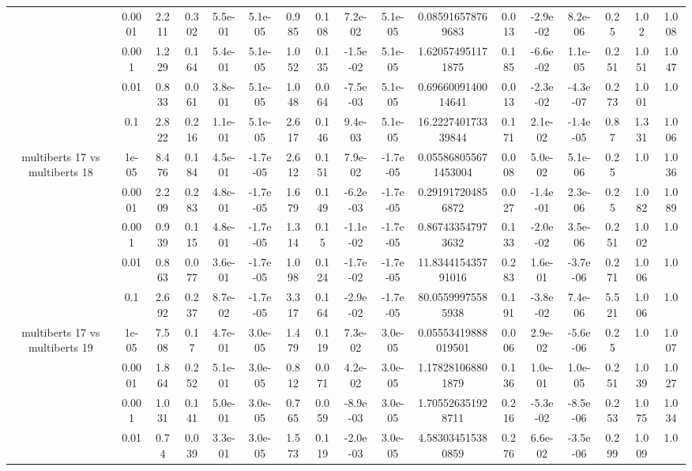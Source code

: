 \begin{tabular}{|c|c|c|c|c|c|c|c|c|c|c|c|c|c|c|c|c|}
 & 0.0001 & 2.211 & 0.302 & 5.5e-01 & 5.1e-05 & 0.985 & 0.108 & 7.2e-02 & 5.1e-05 & 0.085916578769683 & 0.013 & -2.9e-02 & 8.2e-06 & 0.25 & 1.02 & 1.008 \\
 & 0.001 & 1.229 & 0.164 & 5.4e-01 & 5.1e-05 & 1.052 & 0.135 & -1.5e-02 & 5.1e-05 & 1.620574951171875 & 0.185 & -6.6e-02 & 1.1e-05 & 0.251 & 1.051 & 1.047 \\
 & 0.01 & 0.833 & 0.061 & 3.8e-01 & 5.1e-05 & 1.048 & 0.064 & -7.5e-03 & 5.1e-05 & 0.6966009140014641 & 0.013 & -2.3e-02 & -4.3e-07 & 0.273 & 1.001 & 1.0 \\
 & 0.1 & 2.822 & 0.216 & 1.1e-01 & 5.1e-05 & 2.617 & 0.146 & 9.4e-03 & 5.1e-05 & 16.222740173339844 & 0.171 & 2.1e-02 & -1.4e-05 & 0.87 & 1.331 & 1.006 \\
\hline
\multirow{5}{*}{multiberts 17 vs multiberts 18} & 1e-05 & 8.476 & 0.184 & 4.5e-01 & -1.7e-05 & 2.612 & 0.151 & 7.9e-02 & -1.7e-05 & 0.055868055671453004 & 0.008 & 5.0e-02 & 5.1e-06 & 0.25 & 1.0 & 1.036 \\
 & 0.0001 & 2.209 & 0.283 & 4.8e-01 & -1.7e-05 & 1.679 & 0.149 & -6.2e-03 & -1.7e-05 & 0.291917204856872 & 0.027 & -1.4e-01 & 2.3e-06 & 0.25 & 1.082 & 1.089 \\
 & 0.001 & 0.939 & 0.115 & 4.8e-01 & -1.7e-05 & 1.314 & 0.15 & -1.1e-02 & -1.7e-05 & 0.867433547973632 & 0.133 & -2.0e-02 & 3.5e-06 & 0.251 & 1.002 & 1.0 \\
 & 0.01 & 0.863 & 0.077 & 3.6e-01 & -1.7e-05 & 1.098 & 0.124 & -1.7e-02 & -1.7e-05 & 11.834415435791016 & 0.283 & 1.6e-01 & -3.7e-06 & 0.271 & 1.006 & 1.0 \\
 & 0.1 & 2.692 & 0.237 & 8.7e-02 & -1.7e-05 & 3.317 & 0.164 & -2.9e-02 & -1.7e-05 & 80.05599975585938 & 0.191 & -3.8e-02 & 7.4e-06 & 5.521 & 1.006 & 1.0 \\
\hline
\multirow{5}{*}{multiberts 17 vs multiberts 19} & 1e-05 & 7.508 & 0.17 & 4.7e-01 & 3.0e-05 & 1.479 & 0.119 & 7.3e-02 & 3.0e-05 & 0.05553419888019501 & 0.006 & 2.9e-02 & -5.6e-06 & 0.25 & 1.0 & 1.007 \\
 & 0.0001 & 1.864 & 0.252 & 5.1e-01 & 3.0e-05 & 0.812 & 0.071 & 4.2e-02 & 3.0e-05 & 1.178281068801879 & 0.136 & 1.0e-01 & 1.0e-05 & 0.251 & 1.039 & 1.027 \\
 & 0.001 & 1.031 & 0.141 & 5.0e-01 & 3.0e-05 & 0.765 & 0.059 & -8.9e-03 & 3.0e-05 & 1.705526351928711 & 0.216 & -5.3e-02 & -8.5e-06 & 0.253 & 1.075 & 1.034 \\
 & 0.01 & 0.74 & 0.039 & 3.3e-01 & 3.0e-05 & 1.573 & 0.119 & -2.0e-03 & 3.0e-05 & 4.583034515380859 & 0.276 & 6.6e-02 & -3.5e-06 & 0.299 & 1.009 & 1.0 \\

\end{tabular}
